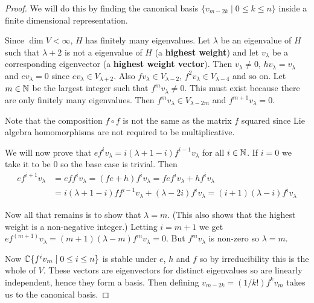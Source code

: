 \begin{proof}
  We will do this by finding the canonical basis $\{v_{m-2k} \mid 0 \leq k \leq n\}$ inside a finite dimensional representation.

  Since $\dim V<\infty$, $H$ has finitely many eigenvalues.
  Let $\lambda$ be an eigenvalue of $H$ such that $\lambda+2$ is not a eigenvalue of $H$ (a \textbf{highest weight}) and let $v_\lambda$ be a corresponding eigenvector (a \textbf{highest weight vector}).
  Then $v_\lambda \neq 0$, $hv_\lambda=v_\lambda$ and $ev_\lambda=0$ since $ev_\lambda \in V_{\lambda+2}$.
  Also $fv_\lambda \in V_{\lambda-2}$, $f^{2} v_\lambda \in V_{\lambda-4}$ and so on.
  Let $m \in \mathbb{N}$ be the largest integer such that $f^m v_\lambda \neq 0$.
  This must exist because there are only finitely many eigenvalues.
  Then $f^{m} v_\lambda \in V_{\lambda-2m}$ and $f^{m+1}v_\lambda = 0$.

  \begin{rmk}
    Note that the composition $f \circ f$ is not the same as the matrix $f$ squared since Lie algebra homomorphisms are not required to be multiplicative.
  \end{rmk}

  We will now prove that $ef^{i}v_\lambda = i(\lambda+1-i)f^{i-1}v_\lambda$ for all $i \in \mathbb{N}$.
  If $i=0$ we take it to be $0$ so the base case is trivial.
  Then
  \begin{align*}
    ef^{i+1}v_\lambda &= eff^{i} v_\lambda = (fe+h)f^{i} v_\lambda = fef^{i} v_\lambda + hf^{i} v_\lambda \\
    &= i(\lambda+1-i)f f^{i-1}v_\lambda + (\lambda-2i)f^{i}v_\lambda = (i+1)(\lambda-i) f^{i}v_\lambda
  \end{align*}

  Now all that remains is to show that $\lambda=m$.
  (This also shows that the highest weight is a non-negative integer.)
  Letting $i=m+1$ we get $ef^{(m+1)}v_\lambda=(m+1)(\lambda-m)f^{m} v_\lambda=0$.
  But $f^{m} v_\lambda$ is non-zero so $\lambda=m$.

  Now $\mathbb{C}\{f^{i} v_m \mid 0 \leq i \leq n\}$ is stable under $e$, $h$ and $f$ so by irreducibility this is the whole of $V$.
  These vectors are eigenvectors for distinct eigenvalues so are linearly independent, hence they form a basis.
  Then defining $v_{m-2k} = (1/k!) f^{k} v_m$ takes us to the canonical basis.
\end{proof}
